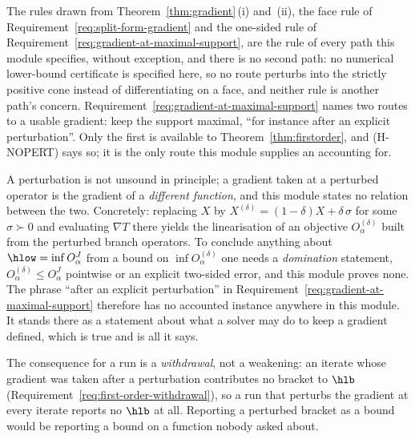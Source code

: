 
\begin{remark}\label{rem:fo-nopert}
The rules drawn from Theorem~\ref{thm:gradient}\,(i) and~(ii), the face
rule of Requirement~\ref{req:split-form-gradient} and the one-sided
rule of Requirement~\ref{req:gradient-at-maximal-support}, are the rule of
every path this module specifies, without exception, and there is no
second path: no numerical lower-bound certificate is specified here, so no
route perturbs into the strictly positive cone instead of differentiating
on a face, and neither rule is another path's concern. Requirement~\ref{req:gradient-at-maximal-support} names
two routes to a usable gradient: keep the support maximal, ``for instance
after an explicit perturbation''. Only the first is available to
Theorem~\ref{thm:firstorder}, and (H-NOPERT) says so; it is the only route
this module supplies an accounting for.

A perturbation is not unsound in principle; a gradient taken at a
perturbed operator is the gradient of a \emph{different function}, and
this module states no relation between the two. Concretely: replacing $X$
by $X^{(\delta)}=(1-\delta)X+\delta\,\sigma$ for some $\sigma\succ0$ and
evaluating $\nabla T$ there yields the linearisation of an objective
$O^{(\delta)}_{\alpha}$ built from the perturbed branch operators. To
conclude anything about $\hlow=\inf O^{J}_{\alpha}$ from a bound on
$\inf O^{(\delta)}_{\alpha}$ one needs a \emph{domination} statement,
$O^{(\delta)}_{\alpha}\le O^{J}_{\alpha}$ pointwise or an explicit
two-sided error, and this module proves none. The phrase ``after an
explicit perturbation'' in
Requirement~\ref{req:gradient-at-maximal-support} therefore has no
accounted instance anywhere in this module. It stands there as a statement
about what a solver may do to keep a gradient defined, which is true and
is all it says.

The consequence for a run is a \emph{withdrawal}, not a weakening: an
iterate whose gradient was taken after a perturbation contributes no
bracket to $\hlb$ (Requirement~\ref{req:first-order-withdrawal}), so a run
that perturbs the gradient at every iterate reports no $\hlb$ at all. Reporting a perturbed
bracket as a  bound would be reporting a bound on a
function nobody asked about.
\end{remark}
